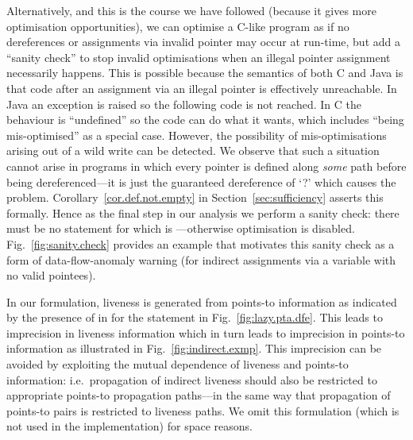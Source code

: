 \documentclass{llncs}
\begin{document}
Alternatively, and this is the course we have followed (because it
gives more optimisation opportunities), we can optimise a C-like
program as if no dereferences or assignments via invalid pointer
may occur at run-time, but add a ``sanity check'' to stop invalid
optimisations when an illegal pointer assignment necessarily happens.
This is possible because the semantics of both C and Java is that code
after an assignment via an illegal pointer is effectively unreachable.
In Java an exception is raised so the following code is not reached.
In C the behaviour is ``undefined'' so the code can do what it wants,
which includes ``being mis-optimised'' as a special case. However, the
possibility of mis-optimisations arising out of a wild write can be
detected.
We observe that such a situation cannot arise in programs in which every
pointer is defined along {\em some} path before being dereferenced---it
is just the guaranteed dereference of `?' which causes the problem.
Corollary~\ref{cor.def.not.empty} in Section~\ref{sec:sufficiency}
asserts this formally. Hence as the final step in our analysis we
perform a sanity check: there must be no statement \text{}
for which \text{} is ---otherwise optimisation
is disabled. Fig.~\ref{fig:sanity.check} provides an example that
motivates this sanity check as a form of data-flow-anomaly warning (for
indirect assignments via a variable with no valid pointees).




In our formulation, liveness is generated from points-to information as
indicated by the presence of  in  for the statement
 in Fig.~\ref{fig:lazy.pta.dfe}. This leads to imprecision in
liveness information which in turn leads to imprecision in points-to
information as illustrated in Fig.~\ref{fig:indirect.exmp}.
This imprecision can be avoided by exploiting
the mutual dependence of liveness and points-to information: i.e.\
propagation of indirect liveness should also be restricted to
appropriate points-to propagation paths---in the same way that
propagation of points-to pairs is restricted to liveness paths.
We omit this formulation (which is not used in the implementation)
for space reasons.
\end{document}
